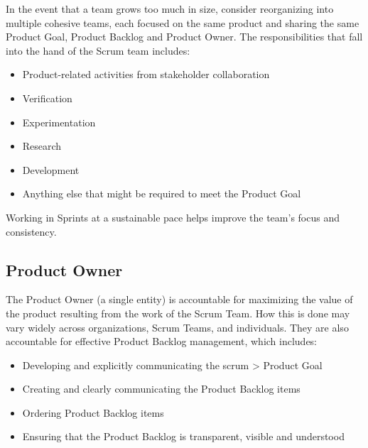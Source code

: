 \begin{flushleft}
	In the event that a team grows too much in size, consider reorganizing into
	multiple cohesive teams, each focused on the same product and sharing the same
	Product Goal, Product Backlog and Product Owner. The responsibilities that fall
	into the hand of the Scrum team includes:
\end{flushleft}

\begin{itemize}
	\item Product-related activities from stakeholder collaboration
	\item Verification
	\item Experimentation
	\item Research
	\item Development
	\item Anything else that might be required to meet the Product Goal
\end{itemize}

\begin{flushleft}
	Working in Sprints at a sustainable pace helps improve the team's focus and consistency.
\end{flushleft}

\subsection{Product Owner}\label{scrum-product-owner}

\begin{flushleft}
	The Product Owner (a single entity) is accountable for maximizing the value of
	the product resulting from the work of the Scrum Team. How this is done may vary
	widely across organizations, Scrum Teams, and individuals. They are also accountable
	for effective Product Backlog management, which includes:
\end{flushleft}

\begin{itemize}
	\item Developing and explicitly communicating the scrum > Product Goal
	\item Creating and clearly communicating the Product Backlog items
	\item Ordering Product Backlog items
	\item Ensuring that the Product Backlog is transparent, visible and understood
\end{itemize}

